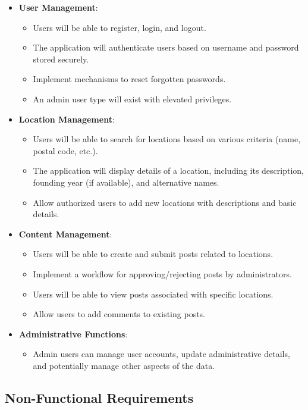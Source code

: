 \begin{itemize}
    \item \textbf{User Management}: 
    \begin{itemize}
        \item Users will be able to register, login, and logout.
        \item The application will authenticate users based on username and password stored securely.
        \item Implement mechanisms to reset forgotten passwords.
        \item An admin user type will exist with elevated privileges.
    \end{itemize}
    \item \textbf{Location Management}:
    \begin{itemize}
        \item Users will be able to search for locations based on various criteria (name, postal code, etc.).
        \item The application will display details of a location, including its description, founding year (if available), and alternative names.
        \item Allow authorized users to add new locations with descriptions and basic details.
    \end{itemize}
    \item \textbf{Content Management}:
    \begin{itemize}
        \item Users will be able to create and submit posts related to locations.
        \item Implement a workflow for approving/rejecting posts by administrators.
        \item Users will be able to view posts associated with specific locations.
        \item Allow users to add comments to existing posts.
    \end{itemize}
    \item \textbf{Administrative Functions}: 
    \begin{itemize}
        \item Admin users can manage user accounts, update administrative details, and potentially manage other aspects of the data.
    \end{itemize}
\end{itemize}

\subsection*{Non-Functional Requirements}

